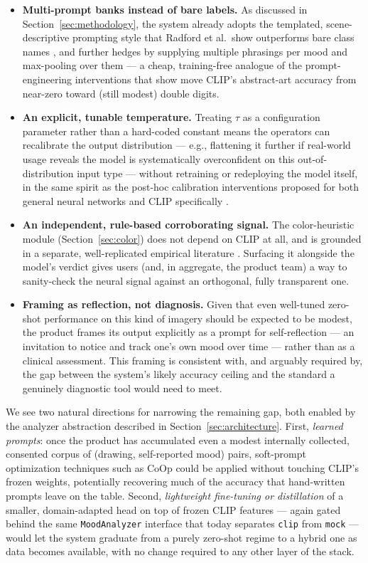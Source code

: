 \documentclass[10pt,twocolumn,letterpaper]{article}
\begin{document}
\begin{itemize}
    \item \textbf{Multi-prompt banks instead of bare labels.} As discussed in Section~\ref{sec:methodology}, the system already adopts the templated, scene-descriptive prompting style that Radford et al.\ show outperforms bare class names \cite{radford2021clip}, and further hedges by supplying multiple phrasings per mood and max-pooling over them --- a cheap, training-free analogue of the prompt-engineering interventions that \citet{conde2024affectiveart} show move CLIP's abstract-art accuracy from near-zero toward (still modest) double digits.
    \item \textbf{An explicit, tunable temperature.} Treating $\tau$ as a configuration parameter rather than a hard-coded constant means the operators can recalibrate the output distribution --- e.g., flattening it further if real-world usage reveals the model is systematically overconfident on this out-of-distribution input type --- without retraining or redeploying the model itself, in the same spirit as the post-hoc calibration interventions proposed for both general neural networks \cite{guo2017calibration} and CLIP specifically \cite{tu2023clipcalibration}.
    \item \textbf{An independent, rule-based corroborating signal.} The color-heuristic module (Section~\ref{sec:color}) does not depend on CLIP at all, and is grounded in a separate, well-replicated empirical literature \cite{wilms2018color,colornature2024}. Surfacing it alongside the model's verdict gives users (and, in aggregate, the product team) a way to sanity-check the neural signal against an orthogonal, fully transparent one.
    \item \textbf{Framing as reflection, not diagnosis.} Given that even well-tuned zero-shot performance on this kind of imagery should be expected to be modest, the product frames its output explicitly as a prompt for self-reflection --- an invitation to notice and track one's own mood over time --- rather than as a clinical assessment. This framing is consistent with, and arguably required by, the gap between the system's likely accuracy ceiling and the standard a genuinely diagnostic tool would need to meet.
\end{itemize}

We see two natural directions for narrowing the remaining gap, both enabled by the analyzer abstraction described in Section~\ref{sec:architecture}. First, \emph{learned prompts}: once the product has accumulated even a modest internally collected, consented corpus of (drawing, self-reported mood) pairs, soft-prompt optimization techniques such as CoOp \cite{zhou2022coop} could be applied without touching CLIP's frozen weights, potentially recovering much of the accuracy that hand-written prompts leave on the table. Second, \emph{lightweight fine-tuning or distillation} of a smaller, domain-adapted head on top of frozen CLIP features --- again gated behind the same \texttt{MoodAnalyzer} interface that today separates \texttt{clip} from \texttt{mock} --- would let the system graduate from a purely zero-shot regime to a hybrid one as data becomes available, with no change required to any other layer of the stack.
\end{document}
